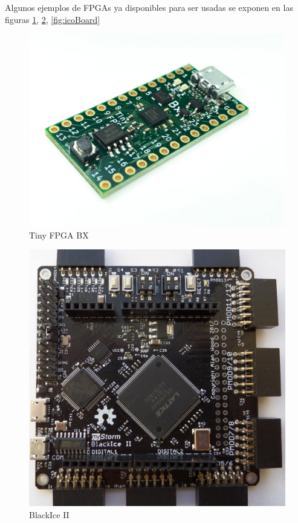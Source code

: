 Algunos ejemplos de FPGAs ya disponibles para ser usadas se exponen en las figuras \ref{fig:tiny_fpga}, \ref{fig:blackIceII}, \ref{fig:icoBoard}
\begin{center}
	\begin{figure}[H]
		\center
		\includegraphics[trim = 0mm 0mm 0mm 0mm, clip,scale=0.15]{imagenes/EstadoArte/tinyFPGABX.jpg}
		\caption{Tiny FPGA BX}
		\label{fig:tiny_fpga}
	\end{figure}
\end{center}
\begin{center}
	\begin{figure}[H]
		\center
		\includegraphics[trim = 0mm 0mm 0mm 0mm, clip,scale=0.1]{imagenes/EstadoArte/BlackIce.jpg}
		\caption{BlackIce II}
		\label{fig:blackIceII}
	\end{figure}
\end{center}
